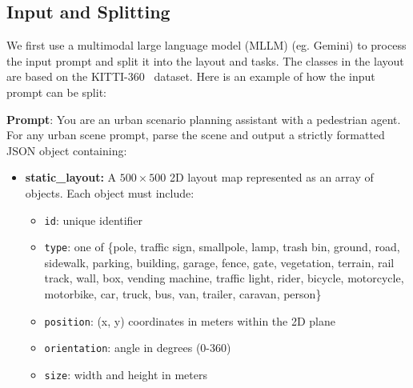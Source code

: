 \documentclass{article}
\begin{document}
\subsection{Input and Splitting}

We first use a multimodal large language model (MLLM) (eg. Gemini) to process the input prompt and split it into the layout and tasks. The classes in the layout are based on the KITTI-360~\cite{liao2022kitti360} dataset. Here is an example of how the input prompt can be split:

\begin{tcolorbox}[examplebox, title=Scene Specification Format]


\textbf{Prompt}: \newline
You are an urban scenario planning assistant with a pedestrian agent. For any urban scene prompt, parse the scene and output a strictly formatted JSON object containing:\\

\begin{itemize}
  
  \item \textbf{static\_layout:} 
    A \begin{math} 500  \times 500 \end{math} 2D layout map represented as an array of objects.  
    Each object must include:  
    \begin{itemize}
        \item \texttt{id}: unique identifier  
        \item \texttt{type}: one of \{pole, traffic sign, smallpole, lamp, trash bin, ground, road, sidewalk, parking, building, garage, fence, gate, vegetation, terrain, rail track, wall, box, vending machine, traffic light, rider, bicycle, motorcycle, motorbike, car, truck, bus, van, trailer, caravan, person\}  
        \item \texttt{position}: (x, y) coordinates in meters within the 2D plane  
        \item \texttt{orientation}: angle in degrees (0-360)
        \item \texttt{size}: width and height in meters  
    \end{itemize}



\end{itemize}
\end{tcolorbox}
\end{document}

